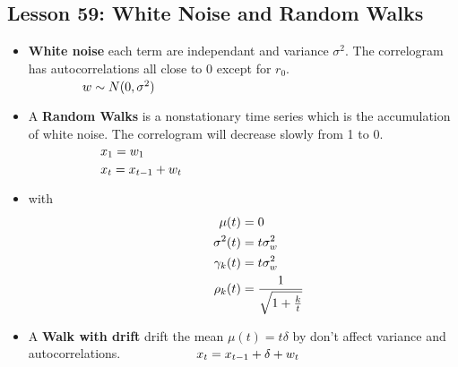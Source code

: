 \documentclass[10pt, french]{article}
\begin{document}
\begin{multicols*}{3}
\section*{Lesson 59: White Noise and Random Walks}
\begin{itemize}[align=left,leftmargin=*]
   \item \textbf{White noise} each term are independant and variance $\sigma^2$. The correlogram has autocorrelations all close to 0 except for $r_0$. \\
   $\hspace*{1.5cm} w \sim N(0,\sigma^2) $
   \item A \textbf{Random Walks} is a nonstationary time series which is the accumulation of white noise. The correlogram will decrease slowly from 1 to 0.
   $\hspace*{2cm}x_1 = w_1$ \\
   $\hspace*{2cm}x_t = x_{t-1} + w_t$
   \item[] with 
   \begin{align*}
        \hspace*{1cm}
      \mu(t) &= 0 \\
      \sigma^2(t) &= t\sigma_w^2 \\
      \gamma_k(t) &= t\sigma_w^2 \\
      \rho_k(t) &= \frac{1}{\sqrt{1 + \frac{k}{t}}}
   \end{align*} 
   \item A \textbf{Walk with drift} drift the mean $\mu(t) = t\delta$ by don't affect variance and autocorrelations.
   $\hspace*{2cm} x_t = x_{t-1} + \delta + w_t$ 
\end{itemize}


\end{multicols*}
\end{document}
